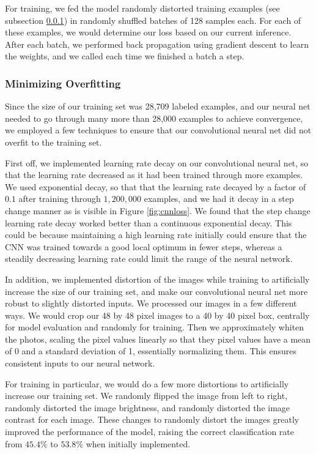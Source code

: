 \documentclass[11pt, twocolumn, twoside]{article}
\begin{document}
For training, we fed the model randomly distorted training examples (see subsection \ref{overfitting}) in randomly shuffled batches of 128 samples each. For each of these examples, we would determine our loss based on our current inference. After each batch, we performed back propagation using gradient descent to learn the weights, and we called each time we finished a batch a step.


\subsubsection{Minimizing Overfitting} \label{overfitting}

Since the size of our training set was 28,709 labeled examples, and our neural net needed to go through many more than 28,000 examples to achieve convergence, we employed a few techniques to ensure that our convolutional neural net did not overfit to the training set.

First off, we implemented learning rate decay on our convolutional neural net, so that the learning rate decreased as it had been trained through more examples. We used exponential decay, so that that the learning rate decayed by a factor of $0.1$ after training through $1,200,000$ examples, and we had it decay in a step change manner as is visible in Figure \ref{fig:cnnloss}. We found that the step change learning rate decay worked better than a continuous exponential decay. This could be because maintaining a high learning rate initially could ensure that the CNN was trained towards a good local optimum in fewer steps, whereas a steadily decreasing learning rate could limit the range of the neural network.

In addition, we implemented distortion of the images while training to artificially increase the size of our training set, and make our convolutional neural net more robust to slightly distorted inputs. We processed our images in a few different ways. We would crop our 48 by 48 pixel images to a 40 by 40 pixel box, centrally for model evaluation and randomly for training. Then we approximately whiten the photos, scaling the pixel values linearly so that they pixel values have a mean of 0 and a standard deviation of 1, essentially normalizing them. This ensures consistent inputs to our neural network.

For training in particular, we would do a few more distortions to artificially increase our training set. We randomly flipped the image from left to right, randomly distorted the image brightness, and 	randomly distorted the image contrast for each image. These changes to randomly distort the images greatly improved the performance of the model, raising the correct classification rate from $45.4\%$ to $53.8\%$ when initially implemented.
\end{document}
